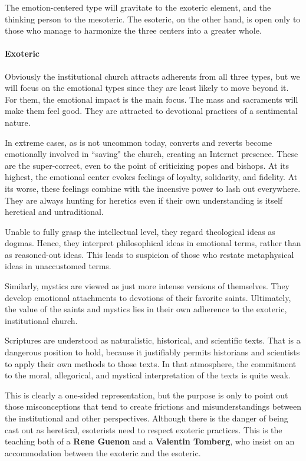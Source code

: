 The emotion-centered type will gravitate to the exoteric element, and the thinking person to the mesoteric. The esoteric, on the other hand, is open only to those who manage to harmonize the three centers into a greater whole.

\paragraph{Exoteric}
Obviously the institutional church attracts adherents from all three types, but we will focus on the emotional types since they are least likely to move beyond it. For them, the emotional impact is the main focus. The mass and sacraments will make them feel good. They are attracted to devotional practices of a sentimental nature.

In extreme cases, as is not uncommon today, converts and reverts become emotionally involved in ``saving" the church, creating an Internet presence. These are the super-correct, even to the point of criticizing popes and bishops. At its highest, the emotional center evokes feelings of loyalty, solidarity, and fidelity. At its worse, these feelings combine with the incensive power to lash out everywhere. They are always hunting for heretics even if their own understanding is itself heretical and untraditional.

Unable to fully grasp the intellectual level, they regard theological ideas as dogmas. Hence, they interpret philosophical ideas in emotional terms, rather than as reasoned-out ideas. This leads to suspicion of those who restate metaphysical ideas in unaccustomed terms.

Similarly, mystics are viewed as just more intense versions of themselves. They develop emotional attachments to devotions of their favorite saints. Ultimately, the value of the saints and mystics lies in their own adherence to the exoteric, institutional church.

Scriptures are understood as naturalistic, historical, and scientific texts. That is a dangerous position to hold, because it justifiably permits historians and scientists to apply their own methods to those texts. In that atmosphere, the commitment to the moral, allegorical, and mystical interpretation of the texts is quite weak.

This is clearly a one-sided representation, but the purpose is only to point out those misconceptions that tend to create frictions and misunderstandings between the institutional and other perspectives. Although there is the danger of being cast out as heretical, esoterists need to respect exoteric practices. This is the teaching both of a \textbf{Rene Guenon} and a \textbf{Valentin Tomberg}, who insist on an accommodation between the exoteric and the esoteric.

